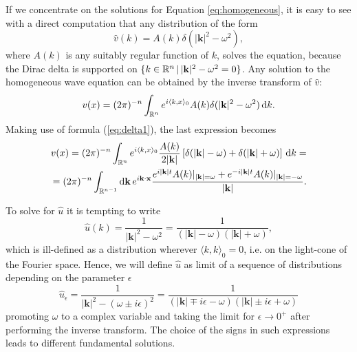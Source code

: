 \noindent If we concentrate on the solutions for Equation \eqref{eq:homogeneous}, it is easy to see with a direct computation that any distribution of the form $$\hat{v}(k)=A(k)\delta(|\mathbf{k}|^2-\omega^2),$$ where $A(k)$ is any suitably regular function of $k$, solves the equation, because the Dirac delta is supported on $\{k\in{\mathbb R}^n\,|\,|\mathbf{k}|^2-\omega^2=0\}$. Any solution to the homogeneous wave equation can be obtained by the inverse transform of $\widehat{v}$:
\[	v(x)=(2\pi)^{-n}	\int_{{\mathbb R}^n} e^{i\langle k,x\rangle_0}A(k)\delta(|\mathbf{k}|^2-\omega^2)\,\mathrm d k.	\]
Making use of formula (\ref{eq:delta1}), the last expression becomes
\begin{equation}
\begin{split}
v(x)=(2\pi)^{-n}	\int_{{\mathbb R}^n} e^{i\langle k,x\rangle_0}\frac{A(k)}{2|\mathbf{k}|}\left[\delta(|\mathbf{k}|-\omega)+\delta(|\mathbf{k}|+\omega)\right]\,\mathrm d k=\\
=(2\pi)^{-n}	\int_{{\mathbb R}^{n-1}}\mathrm d\mathbf{k}\,e^{i\mathbf{k}\cdot\mathbf{x}}\frac{e^{i|\mathbf{k}|t}A(k)|_{|\mathbf{k}|=\omega}+e^{-i|\mathbf{k}|t}A(k)|_{|\mathbf{k}|=-\omega}}{|\mathbf{k}|}.\end{split}
\label{eq:homo}
\end{equation}	



To solve for $\widehat{u}$ it is tempting to write
\[	\hat{u}(k)=\frac{1}{|\mathbf{k}|^2-\omega^2}=\frac{1}{(|\mathbf{k}|-\omega)(|\mathbf{k}|+\omega)},%
\]
which is ill-defined as a distribution wherever $\langle k,k\rangle_0=0$, i.e. on the light-cone of the Fourier space. Hence, we will define $\hat{u}$ as limit of a sequence of distributions depending on the parameter $\epsilon$
\[	\hat{u}_\epsilon=\frac{1}{|\mathbf{k}|^2-(\omega\pm i\epsilon)^2}=\frac{1}{(|\mathbf{k}|\mp i\epsilon-\omega)(|\mathbf{k}|\pm i\epsilon+\omega)}		\]
promoting $\omega$ to a complex variable and taking the limit for $\epsilon\to 0^+$ after performing the inverse transform. The choice of the signs in such expressions leads to different fundamental solutions.

